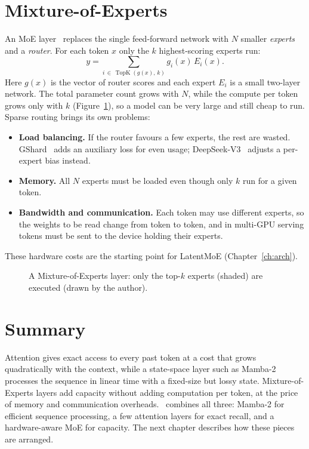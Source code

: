 \section{Mixture-of-Experts}

An MoE layer~\cite{shazeer2017moe} replaces the single feed-forward network
with $N$ smaller \emph{experts} and a \emph{router}. For each token $x$ only
the $k$ highest-scoring experts run:
\begin{equation}
  y = \sum_{i \,\in\, \operatorname{TopK}(g(x),\,k)} g_i(x)\, E_i(x).
  \label{eq:moe}
\end{equation}
Here $g(x)$ is the vector of router scores and each expert $E_i$ is a small
two-layer network. The total parameter count grows with $N$, while the compute
per token grows only with $k$ (Figure~\ref{fig:moe}), so a model can be very
large and still cheap to run. Sparse routing brings its own problems:
\begin{itemize}
  \item \textbf{Load balancing.} If the router favours a few experts, the rest
        are wasted. GShard~\cite{lepikhin2020gshard} adds an auxiliary loss
        for even usage; DeepSeek-V3~\cite{deepseek2024v3} adjusts a per-expert
        bias instead.
  \item \textbf{Memory.} All $N$ experts must be loaded even though only $k$
        run for a given token.
  \item \textbf{Bandwidth and communication.} Each token may use different
        experts, so the weights to be read change from token to token, and in
        multi-GPU serving tokens must be sent to the device holding their
        experts.
\end{itemize}
These hardware costs are the starting point for LatentMoE
(Chapter~\ref{ch:arch}).

\begin{figure}[!htbp]
  \centering
  
  \caption[Mixture-of-Experts layer with router and top-$k$ selection]{A
  Mixture-of-Experts layer: only the top-$k$ experts (shaded) are executed
  (drawn by the author).}
  \label{fig:moe}
\end{figure}

\section{Summary}

Attention gives exact access to every past token at a cost that grows
quadratically with the context, while a state-space layer such as Mamba-2
processes the sequence in linear time with a fixed-size but lossy state.
Mixture-of-Experts layers add capacity without adding computation per token,
at the price of memory and communication overheads. \NS\ combines all three:
Mamba-2 for efficient sequence processing, a few attention layers for exact
recall, and a hardware-aware MoE for capacity. The next chapter describes how
these pieces are arranged.
